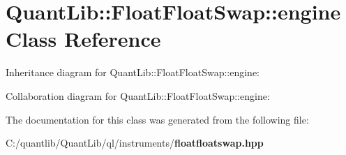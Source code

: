 \section{Quant\+Lib\+:\+:Float\+Float\+Swap\+:\+:engine Class Reference}
\label{class_quant_lib_1_1_float_float_swap_1_1engine}


Inheritance diagram for Quant\+Lib\+:\+:Float\+Float\+Swap\+:\+:engine\+:


Collaboration diagram for Quant\+Lib\+:\+:Float\+Float\+Swap\+:\+:engine\+:


The documentation for this class was generated from the following file\+:\begin{DoxyCompactItemize}
\item 
C\+:/quantlib/\+Quant\+Lib/ql/instruments/{\bf floatfloatswap.\+hpp}\end{DoxyCompactItemize}
